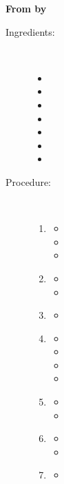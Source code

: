 \documentclass[11pt,letterpaper]{article}
\begin{document}


\begin{flushright}
{\bf From {\it } by }
\end{flushright}
 
\begin{description}

\item[Ingredients:]\ \\
	\begin{itemize}
	\item 
	\item 
	\item 
	\item 
	\item 
	\item 
	\item 
	\end{itemize}

\item[Procedure:]\ \\
	\begin{enumerate}
	\item {\bf }
	\begin{itemize}
	\item 
        \item 
	\item 
	\end{itemize}
	\item {\bf }
	\begin{itemize}
	\item 
	\item 
	\end{itemize}
	\item {\bf }
	\begin{itemize}
	\item 
	\end{itemize}
	\item {\bf }
	\begin{itemize}
	\item 
	\item 
	\item 
	\item 
	\end{itemize}
	\item {\bf }
	\begin{itemize}
	\item 
	\item 
	\end{itemize}
	\item {\bf }
	\begin{itemize}
	\item 
	\item 
	\end{itemize}
	\item {\bf }
	\begin{itemize}
	\item 
	\end{itemize}
	\end{enumerate}

\end{description}
\end{document}

